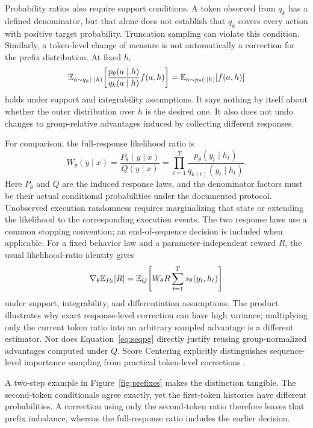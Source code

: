 Probability ratios also require support conditions. A token observed from $q_k$ has a defined denominator, but that alone does not establish that $q_k$ covers every action with positive target probability. Truncation sampling can violate this condition. Similarly, a token-level change of measure is not automatically a correction for the prefix distribution. At fixed $h$,
\begin{equation}\label{eq:is}
\mathbb{E}_{a\sim q_k(\cdot\mid h)}\!\left[\frac{p_\theta(a\mid h)}{q_k(a\mid h)}f(a,h)\right]
=\mathbb{E}_{a\sim p_\theta(\cdot\mid h)}[f(a,h)]
\end{equation}
holds under support and integrability assumptions. It says nothing by itself about whether the outer distribution over $h$ is the desired one. It also does not undo changes to group-relative advantages induced by collecting different responses.

For comparison, the full-response likelihood ratio is
\begin{equation}\label{eq:trajectory}
W_\theta(y\mid x)=\frac{P_\theta(y\mid x)}{Q(y\mid x)}
=\prod_{t=1}^{T}\frac{p_\theta(y_t\mid h_t)}{q_{k(t)}(y_t\mid h_t)}.
\end{equation}
Here $P_\theta$ and $Q$ are the induced response laws, and the denominator factors must be their actual conditional probabilities under the documented protocol. Unobserved execution randomness requires marginalizing that state or extending the likelihood to the corresponding execution events. The two response laws use a common stopping convention; an end-of-sequence decision is included when applicable. For a fixed behavior law and a parameter-independent reward $R$, the usual likelihood-ratio identity gives
\begin{equation}\label{eq:seqpg}
\nabla_\theta\mathbb{E}_{P_\theta}[R]
=\mathbb{E}_Q\!\left[W_\theta R\sum_{t=1}^{T}s_\theta(y_t,h_t)\right]
\end{equation}
under support, integrability, and differentiation assumptions. The product illustrates why exact response-level correction can have high variance; multiplying only the current token ratio into an arbitrary sampled advantage is a different estimator. Nor does Equation~\eqref{eq:seqpg} directly justify reusing group-normalized advantages computed under $Q$. Score Centering explicitly distinguishes sequence-level importance sampling from practical token-level corrections \citep{score}.


A two-step example in Figure~\ref{fig:prefixes} makes the distinction tangible. The second-token conditionals agree exactly, yet the first-token histories have different probabilities. A correction using only the second-token ratio therefore leaves that prefix imbalance, whereas the full-response ratio includes the earlier decision.

